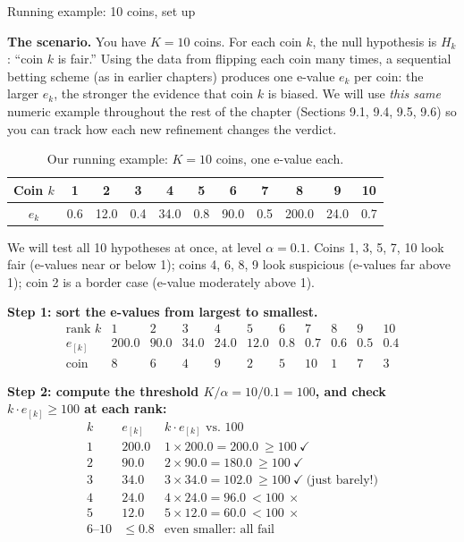 \documentclass[aspectratio=169,10pt]{beamer}
\begin{document}
\begin{frame}[allowframebreaks]{Running example: 10 coins, set up}

\textbf{The scenario.} You have $K=10$ coins. For each coin $k$, the null hypothesis is $H_k$: ``coin $k$ is fair.'' Using the data from flipping each coin many times, a sequential betting scheme (as in earlier chapters) produces one e-value $e_k$ per coin: the larger $e_k$, the stronger the evidence that coin $k$ is biased. We will use \emph{this same} numeric example throughout the rest of the chapter (Sections 9.1, 9.4, 9.5, 9.6) so you can track how each new refinement changes the verdict.

\begin{table}[]
\centering
\begin{tabular}{c|cccccccccc}
\toprule
Coin $k$ & 1 & 2 & 3 & 4 & 5 & 6 & 7 & 8 & 9 & 10 \\
\midrule
$e_k$ & 0.6 & 12.0 & 0.4 & 34.0 & 0.8 & 90.0 & 0.5 & 200.0 & 24.0 & 0.7 \\
\bottomrule
\end{tabular}
\caption{Our running example: $K=10$ coins, one e-value each.}
\end{table}

We will test all 10 hypotheses at once, at level $\alpha = 0.1$. Coins 1, 3, 5, 7, 10 look fair (e-values near or below 1); coins 4, 6, 8, 9 look suspicious (e-values far above 1); coin 2 is a border case (e-value moderately above 1).

\framebreak

\textbf{Step 1: sort the e-values from largest to smallest.}
\[
\begin{array}{c|cccccccccc}
\text{rank } k & 1 & 2 & 3 & 4 & 5 & 6 & 7 & 8 & 9 & 10 \\
\hline
e_{[k]} & 200.0 & 90.0 & 34.0 & 24.0 & 12.0 & 0.8 & 0.7 & 0.6 & 0.5 & 0.4 \\
\text{coin} & 8 & 6 & 4 & 9 & 2 & 5 & 10 & 1 & 7 & 3
\end{array}
\]

\textbf{Step 2: compute the threshold $K/\alpha = 10/0.1 = 100$, and check $k \cdot e_{[k]} \ge 100$ at each rank:}
\[
\begin{array}{c|c|c}
k & e_{[k]} & k\cdot e_{[k]} \text{ vs. } 100\\
\hline
1 & 200.0 & 1\times 200.0 = 200.0 \ \ge 100 \ \checkmark \\
2 & 90.0 & 2\times 90.0 = 180.0 \ \ge 100 \ \checkmark \\
3 & 34.0 & 3\times 34.0 = 102.0 \ \ge 100 \ \checkmark \ \text{(just barely!)}\\
4 & 24.0 & 4\times 24.0 = 96.0 \ < 100 \ \times \\
5 & 12.0 & 5\times 12.0 = 60.0 \ < 100 \ \times \\
6\text{--}10 & \le 0.8 & \text{even smaller: all fail}
\end{array}
\]


\end{frame}
\end{document}
